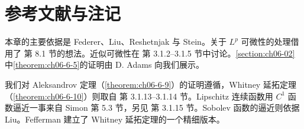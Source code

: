 \documentclass[../../main.tex]{subfiles}%
\begin{document}
\section{参考文献与注记}\label{section:ch06-07}

本章的主要依据是 Federer\cite{federer1969}、Liu\cite{liu1977}、Reshetnjak\cite{reshetnjak1968} 与 Stein\cite{stein1970}。关于 $L^p$ 可微性的处理借用了\cite{stein1970} 第 8.1 节的想法。近似可微性在\cite{federer1969} 第 3.1.2--3.1.5 节中讨论。\cref{section:ch06-02}中\cref{theorem:ch06-6-5}的证明由 D. Adams 向我们展示。%

我们对 Aleksandrov 定理（\cref{theorem:ch06-6-9}）的证明遵循\cite{reshetnjak1968}，Whitney 延拓定理（\cref{theorem:ch06-6-10}）则取自\cite{federer1969} 第 3.1.13--3.1.14 节。Lipschitz 连续函数用 $C^1$ 函数逼近一事来自 Simon\cite{simon1984} 第 5.3 节，另见\cite{federer1969} 第 3.1.15 节。Sobolev 函数的逼近则依据 Liu\cite{liu1977}。Fefferman\cite{fefferman2005} 建立了 Whitney 延拓定理的一个精细版本。%
\end{document}
